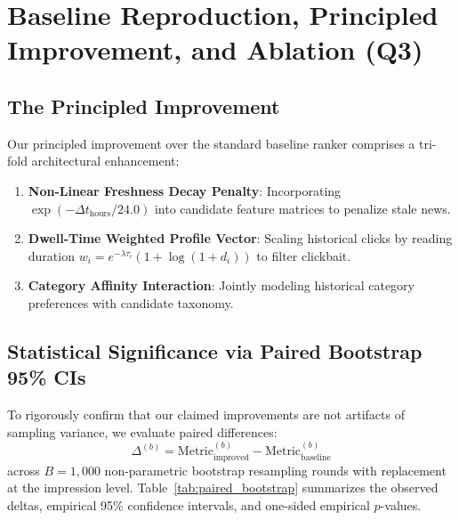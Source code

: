\documentclass[11pt,a4paper]{article}
\begin{document}
\section{Baseline Reproduction, Principled Improvement, and Ablation (Q3)}

\subsection{The Principled Improvement}
Our principled improvement over the standard baseline ranker comprises a tri-fold architectural enhancement:
\begin{enumerate}[noitemsep,topsep=1pt,leftmargin=*]
    \item \textbf{Non-Linear Freshness Decay Penalty}: Incorporating $\exp(-\Delta t_{\text{hours}} / 24.0)$ into candidate feature matrices to penalize stale news.
    \item \textbf{Dwell-Time Weighted Profile Vector}: Scaling historical clicks by reading duration $w_i = e^{-\lambda \tau_i}(1 + \log(1 + d_i))$ to filter clickbait.
    \item \textbf{Category Affinity Interaction}: Jointly modeling historical category preferences with candidate taxonomy.
\end{enumerate}

\subsection{Statistical Significance via Paired Bootstrap 95\% CIs}
To rigorously confirm that our claimed improvements are not artifacts of sampling variance, we evaluate paired differences:
\begin{equation}
\Delta^{(b)} = \text{Metric}_{\text{improved}}^{(b)} - \text{Metric}_{\text{baseline}}^{(b)}
\end{equation}
across $B = 1,000$ non-parametric bootstrap resampling rounds with replacement at the impression level. Table~\ref{tab:paired_bootstrap} summarizes the observed deltas, empirical 95\% confidence intervals, and one-sided empirical $p$-values.
\end{document}

